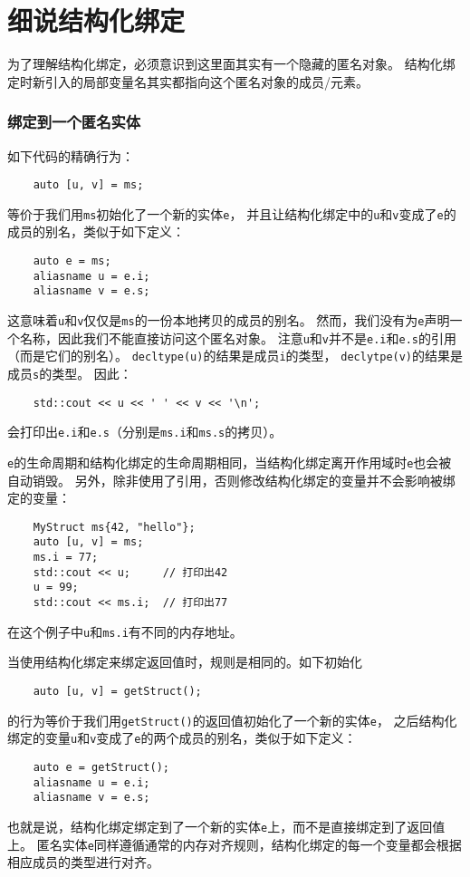 \section{细说结构化绑定}
为了理解结构化绑定，必须意识到这里面其实有一个隐藏的匿名对象。
结构化绑定时新引入的局部变量名其实都指向这个匿名对象的成员/元素。

\subsubsection{绑定到一个匿名实体}
如下代码的精确行为：
\begin{lstlisting}
    auto [u, v] = ms;
\end{lstlisting}
等价于我们用\texttt{ms}初始化了一个新的实体\texttt{e}，
并且让结构化绑定中的\texttt{u}和\texttt{v}变成了\texttt{e}的成员的别名，类似于如下定义：
\begin{lstlisting}
    auto e = ms;
    aliasname u = e.i;
    aliasname v = e.s;
\end{lstlisting}
这意味着\texttt{u}和\texttt{v}仅仅是\texttt{ms}的一份本地拷贝的成员的别名。
然而，我们没有为\texttt{e}声明一个名称，因此我们不能直接访问这个匿名对象。
注意\texttt{u}和\texttt{v}并不是\texttt{e.i}和\texttt{e.s}的引用（而是它们的别名）。
\texttt{decltype(u)}的结果是成员\texttt{i}的类型，
\texttt{declytpe(v)}的结果是成员\texttt{s}的类型。
因此：
\begin{lstlisting}
    std::cout << u << ' ' << v << '\n';
\end{lstlisting}
会打印出\texttt{e.i}和\texttt{e.s}（分别是\texttt{ms.i}和\texttt{ms.s}的拷贝）。

\texttt{e}的生命周期和结构化绑定的生命周期相同，当结构化绑定离开作用域时\texttt{e}也会被自动销毁。
另外，除非使用了引用，否则修改结构化绑定的变量并不会影响被绑定的变量：
\begin{lstlisting}
    MyStruct ms{42, "hello"};
    auto [u, v] = ms;
    ms.i = 77;
    std::cout << u;     // 打印出42
    u = 99;
    std::cout << ms.i;  // 打印出77
\end{lstlisting}
在这个例子中\texttt{u}和\texttt{ms.i}有不同的内存地址。

当使用结构化绑定来绑定返回值时，规则是相同的。如下初始化
\begin{lstlisting}
    auto [u, v] = getStruct();
\end{lstlisting}
的行为等价于我们用\texttt{getStruct()}的返回值初始化了一个新的实体\texttt{e}，
之后结构化绑定的变量\texttt{u}和\texttt{v}变成了\texttt{e}的两个成员的别名，类似于如下定义：
\begin{lstlisting}
    auto e = getStruct();
    aliasname u = e.i;
    aliasname v = e.s;
\end{lstlisting}
也就是说，结构化绑定绑定到了一个新的实体\texttt{e}上，而不是直接绑定到了返回值上。
匿名实体\texttt{e}同样遵循通常的内存对齐规则，结构化绑定的每一个变量都会根据相应成员的类型进行对齐。


